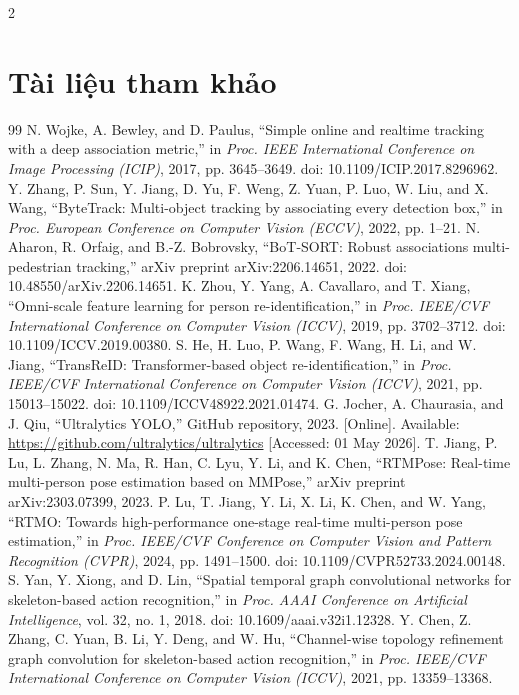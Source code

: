 \documentclass[a4paper, twoside, 10pt]{article}
\begin{document}
\begin{multicols}{2}
\section*{Tài liệu tham khảo}
{\tiny
\setlength{\parskip}{0pt}
\begin{thebibliography}{99}
\setlength{\itemsep}{-2pt}\setlength{\parskip}{0pt}\setlength{\parsep}{0pt}
 N. Wojke, A. Bewley, and D. Paulus, ``Simple online and realtime tracking with a deep association metric,'' in \textit{Proc. IEEE International Conference on Image Processing (ICIP)}, 2017, pp. 3645--3649. doi: 10.1109/ICIP.2017.8296962.
 Y. Zhang, P. Sun, Y. Jiang, D. Yu, F. Weng, Z. Yuan, P. Luo, W. Liu, and X. Wang, ``ByteTrack: Multi-object tracking by associating every detection box,'' in \textit{Proc. European Conference on Computer Vision (ECCV)}, 2022, pp. 1--21.
 N. Aharon, R. Orfaig, and B.-Z. Bobrovsky, ``BoT-SORT: Robust associations multi-pedestrian tracking,'' arXiv preprint arXiv:2206.14651, 2022. doi: 10.48550/arXiv.2206.14651.
 K. Zhou, Y. Yang, A. Cavallaro, and T. Xiang, ``Omni-scale feature learning for person re-identification,'' in \textit{Proc. IEEE/CVF International Conference on Computer Vision (ICCV)}, 2019, pp. 3702--3712. doi: 10.1109/ICCV.2019.00380.
 S. He, H. Luo, P. Wang, F. Wang, H. Li, and W. Jiang, ``TransReID: Transformer-based object re-identification,'' in \textit{Proc. IEEE/CVF International Conference on Computer Vision (ICCV)}, 2021, pp. 15013--15022. doi: 10.1109/ICCV48922.2021.01474.
 G. Jocher, A. Chaurasia, and J. Qiu, ``Ultralytics YOLO,'' GitHub repository, 2023. [Online]. Available: \url{https://github.com/ultralytics/ultralytics} [Accessed: 01 May 2026].
 T. Jiang, P. Lu, L. Zhang, N. Ma, R. Han, C. Lyu, Y. Li, and K. Chen, ``RTMPose: Real-time multi-person pose estimation based on MMPose,'' arXiv preprint arXiv:2303.07399, 2023.
 P. Lu, T. Jiang, Y. Li, X. Li, K. Chen, and W. Yang, ``RTMO: Towards high-performance one-stage real-time multi-person pose estimation,'' in \textit{Proc. IEEE/CVF Conference on Computer Vision and Pattern Recognition (CVPR)}, 2024, pp. 1491--1500. doi: 10.1109/CVPR52733.2024.00148.
 S. Yan, Y. Xiong, and D. Lin, ``Spatial temporal graph convolutional networks for skeleton-based action recognition,'' in \textit{Proc. AAAI Conference on Artificial Intelligence}, vol. 32, no. 1, 2018. doi: 10.1609/aaai.v32i1.12328.
 Y. Chen, Z. Zhang, C. Yuan, B. Li, Y. Deng, and W. Hu, ``Channel-wise topology refinement graph convolution for skeleton-based action recognition,'' in \textit{Proc. IEEE/CVF International Conference on Computer Vision (ICCV)}, 2021, pp. 13359--13368.

\end{thebibliography}}
\end{multicols}
\end{document}
